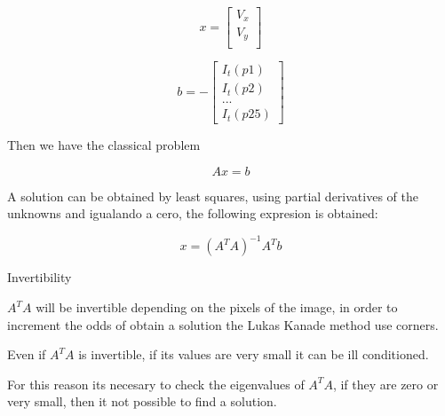$$
x=
\begin{bmatrix}
V_x \\
V_y\\
\end{bmatrix}
$$

$$
b=
-\begin{bmatrix}
I_t(p1) \\
I_t(p2) \\
...     \\
I_t(p25) 
\end{bmatrix}
$$

Then we have the classical problem

$$ 
Ax = b
$$

A solution can be obtained by least squares, using partial derivatives of the unknowns and igualando a cero, the following expresion
 is obtained:

$$
x = (A^T A)^{-1} A^T b
$$

Invertibility 

$A^T A$ will be invertible depending on the pixels of the image, in order to increment the odds of obtain a solution the Lukas Kanade method use corners.

Even if $A^T A $ is invertible, if its values are very small it can be ill conditioned.

For this reason its necesary to check the eigenvalues of $A^T A$, if they are zero or very small, then it not possible to find a solution.




